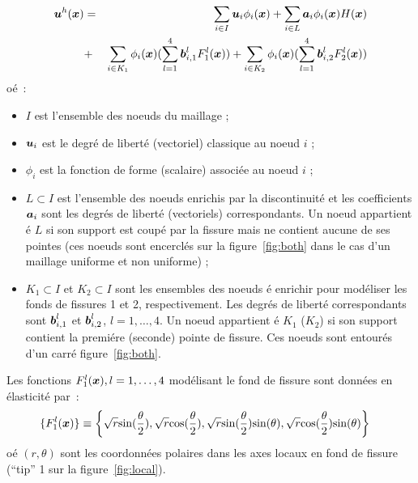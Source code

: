 \begin{eqnarray*}
\mbox{\boldmath $u$}^h(\mbox{\boldmath $x$}) & = & \sum_{i\in I} \mbox{\boldmath $u$}_i \phi_i(\mbox{\boldmath $x$}) +
\sum_{i\in L} \mbox{\boldmath $a$}_i \phi_i(\mbox{\boldmath $x$}) H(\mbox{\boldmath $x$}) \\ \nonumber
& + & \sum_{i\in K_1} \phi_i(\mbox{\boldmath $x$}) (\sum_{l=1}^{4} \mbox{\boldmath $b$}_{i,1}^{l}  F^l_{1}(\mbox{\boldmath $x$})) +
\sum_{i\in K_2} \phi_i(\mbox{\boldmath $x$}) (\sum_{l=1}^{4} \mbox{\boldmath $b$}_{i,2}^{l}  F^l_{2}(\mbox{\boldmath $x$})) \nonumber
\label{eq:appgen}
\end{eqnarray*}
o\'e~:
\begin{itemize}
\item $I$ est l'ensemble des noeuds du maillage ;
\item $\mbox{\boldmath $u$}_i$ est le degr\'e de libert\'e (vectoriel) classique au noeud $i$ ;
\item $\phi_i$ est la fonction de forme (scalaire) associ\'ee au noeud $i$ ;
\item $L\subset I$ est l'ensemble des noeuds enrichis par
la discontinuit\'e et  les coefficients $\mbox{\boldmath $a$}_i$ sont les
degr\'es de libert\'e (vectoriels) correspondants.
Un noeud appartient \'e $L$ si son support est coup\'e par
la fissure mais ne contient aucune de ses pointes (ces
noeuds sont encercl\'es sur la figure~\ref{fig:both} dans
le cas d'un maillage uniforme et non uniforme) ;

\item $K_1\subset I$ et $K_2\subset I$ sont les ensembles
des noeuds \'e enrichir pour mod\'eliser les fonds de fissures
1 et 2, respectivement.
Les degr\'es de libert\'e correspondants sont
$\mbox{\boldmath $b$}_{i,1}^{l}$ et $\mbox{\boldmath $b$}_{i,2}^{l}$, $l=1,\ldots,4$.
Un noeud appartient \'e $K_1$
($K_2$)  si son support contient la premi\'ere (seconde)
pointe de fissure. Ces noeuds sont entour\'es d'un carr\'e
figure~\ref{fig:both}.
\end{itemize}


Les fonctions $F^l_1(\mbox{\boldmath $x$}), l=1,\ldots,4$ mod\'elisant le fond de fissure
sont donn\'ees en \'elasticit\'e par~:
\begin{eqnarray}
\label{enrich_fun}
\{F_1^l(\mbox{\boldmath $x$})\} & \equiv \left\{ \sqrt{r}
\mbox{sin}(\frac{\theta}{2}), \sqrt{r} \mbox{cos}(\frac{\theta}{2}),
\sqrt{r}\mbox{sin}(\frac{\theta}{2})\mbox{sin}(\theta),
\sqrt{r}\mbox{cos}(\frac{\theta}{2})\mbox{sin}(\theta) \right\}
\end{eqnarray}
o\'e $(r,\theta)$ sont les coordonn\'ees polaires
dans les axes locaux en fond de fissure
(``tip'' 1 sur la  figure~\ref{fig:local}).

